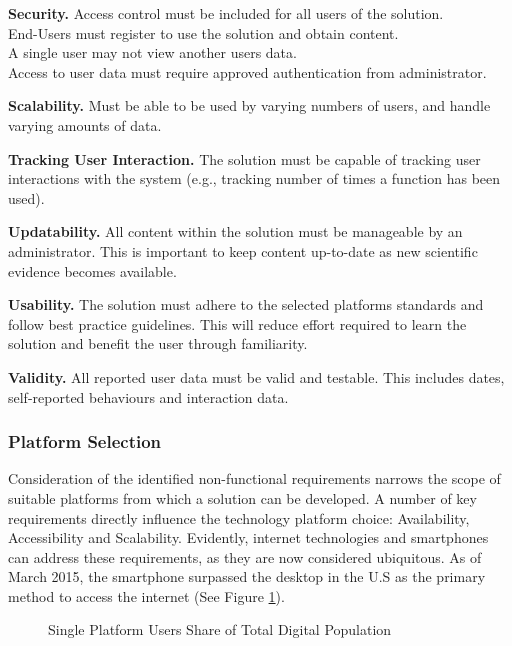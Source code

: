 \textbf{Security.}
Access control must be included for all users of the solution.
\\End-Users must register to use the solution and obtain content.
\\A single user may not view another users data.
\\Access to user data must require approved authentication from administrator.

\textbf{Scalability.}
Must be able to be used by varying numbers of users, and handle varying amounts of data.

\textbf{Tracking User Interaction.}
The solution must be capable of tracking user interactions with the system (e.g., tracking number of times a function has been used).

\textbf{Updatability.}
All content within the solution must be manageable by an administrator. This is important to keep content up-to-date as new scientific evidence becomes available.

\textbf{Usability.}
The solution must adhere to the selected platforms standards and follow best practice guidelines. This will reduce effort required to learn the solution and benefit the user through familiarity.

\textbf{Validity.}
All reported user data must be valid and testable. This includes dates, self-reported behaviours and interaction data.

\subsubsection{Platform Selection}
Consideration of the identified non-functional requirements narrows the scope of suitable platforms from which a solution can be developed. A number of key requirements directly influence the technology platform choice: Availability, Accessibility and Scalability.
Evidently, internet technologies and smartphones can address these  requirements, as they are now considered ubiquitous. As of March 2015, the smartphone surpassed the desktop in the U.S as the primary method to access the internet \cite{ComScore} (See Figure \ref{fig: graph-internetuse}).

\begin{figure}[h]
	\caption{Single Platform Users Share of Total Digital Population}
    \label{fig: graph-internetuse}
\end{figure}

